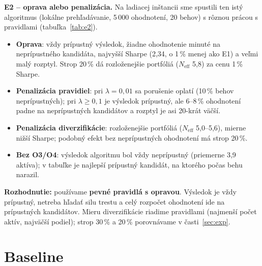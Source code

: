 \documentclass[10pt,a4paper]{article}
\begin{document}
\textbf{E2 -- oprava alebo penalizácia.} Na ladiacej inštancii sme spustili ten istý algoritmus
(lokálne prehľadávanie, 5\,000 ohodnotení, 20 behov) s rôznou prácou s pravidlami (tabuľka~\ref{tab:e2}).
\begin{itemize}
\item \textbf{Oprava}: vždy prípustný výsledok, žiadne ohodnotenie minuté na neprípustného kandidáta, najvyšší
  Sharpe (2,34, o 1\,\% menej ako E1) a veľmi malý rozptyl. Strop 20\,\% dá rozloženejšie portfóliá
  ($N_\text{eff}$ 5,8) za cenu 1\,\% Sharpe.
\item \textbf{Penalizácia pravidiel}: pri $\lambda=0{,}01$ sa porušenie oplatí (10\,\% behov neprípustných);
  pri $\lambda\ge0{,}1$ je výsledok prípustný, ale 6--8\,\% ohodnotení padne na neprípustných kandidátov
  a rozptyl je asi 20-krát väčší.
\item \textbf{Penalizácia diverzifikácie}: rozloženejšie portfóliá ($N_\text{eff}$ 5,0--5,6), mierne nižší Sharpe;
  podobný efekt bez neprípustných ohodnotení má strop 20\,\%.
\item \textbf{Bez O3/O4}: výsledok algoritmu bol vždy neprípustný (priemerne 3,9 aktíva); v tabuľke je
  najlepší prípustný kandidát, na ktorého počas behu narazil.
\end{itemize}

\begin{table}[!ht]
\centering\small
\caption{E2 (ladiaca inštancia, 20 behov po 5\,000 ohodnotení). Prípustné = podiel behov s prípustným
výsledkom; nepríp. ohodn. = podiel ohodnotení minutých na neprípustných kandidátov; $\lambda$ = sila trestu.
Sharpe je priemer $\pm$ smerodajná odchýlka cez behy, pre odovzdané (vždy prípustné) portfólio.}
\label{tab:e2}

\end{table}

\textbf{Rozhodnutie:} používame \textbf{pevné pravidlá s opravou}. Výsledok je vždy prípustný, netreba
hľadať silu trestu a celý rozpočet ohodnotení ide na prípustných kandidátov. Mieru diverzifikácie riadime
pravidlami (najmenší počet aktív, najväčší podiel); strop 30\,\% a 20\,\% porovnávame v časti~\ref{sec:exp}.

\section{Baseline}
\label{sec:base}
\end{document}
